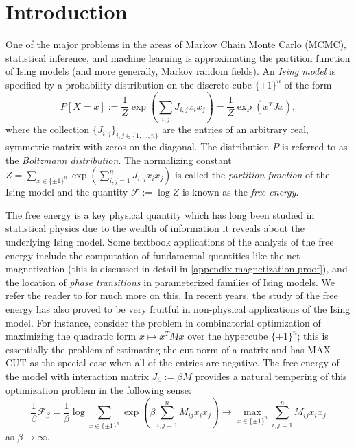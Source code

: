 \documentclass[final, 12pt]{colt2018}
\newcommand{\F}{\mathcal{F}}
\theoremstyle{definition}
\theoremstyle{plain}
\begin{document}
\section{Introduction}
One of the major problems in the areas of Markov Chain Monte Carlo (MCMC), statistical inference, and machine learning is approximating the partition function of Ising models (and more generally, Markov random fields). An \emph{Ising model} is specified by
a probability distribution on the discrete cube $\{\pm1\}^n$ of the form
\[ P[X = x] := \frac{1}{Z} \exp(\sum_{i,j} J_{i,j} x_i x_j) = \frac{1}{Z} \exp(x^T J x), \]
where the collection $\{J_{i,j}\}_{i,j\in\{1,\dots,n\}}$ are the entries of
an arbitrary real, symmetric matrix with zeros on the diagonal. The distribution $P$ is referred to as the \emph{Boltzmann distribution}. The normalizing constant $Z=\sum_{x\in\{\pm1\}^{n}}\exp(\sum_{i,j=1}^{n}J_{i,j}x_{i}x_{j})$
is called the \emph{partition function }of the Ising model and the quantity $\F := \log{Z}$ is known as the \emph{free energy}. 

The free energy is a key physical quantity which has long been studied in statistical physics due to the wealth of information it reveals about the underlying Ising model. Some textbook applications of the analysis of the free energy include the computation of fundamental quantities like the net magnetization (this is discussed in detail in \cref{appendix-magnetization-proof}), and the location of \emph{phase transitions} in parameterized families of Ising models. We refer the reader to \citep{ellis2007entropy} for much more on this. In recent years, the study of the free energy has also proved to be very fruitful in non-physical applications of the Ising model. For instance, consider the problem in combinatorial optimization of maximizing the quadratic form $x \mapsto x^T M x$ over the hypercube $\{\pm 1\}^{n}$; this is essentially the problem of estimating the cut norm of a matrix and has MAX-CUT as the special case when all of the entries are negative. The free energy of the model with interaction matrix $J_{\beta}:=\beta M$ provides a natural tempering of this optimization problem in the following sense:   
\[ \frac{1}{\beta} \mathcal{F}_{\beta} = \frac{1}{\beta} \log \sum_{x\in \{\pm 1\}^{n}}\exp\left(\beta \sum_{i,j=1}^{n}M_{ij}x_{i}x_{j}\right) \to \max_{x \in \{\pm 1\}^n} \sum_{i,j = 1}^n M_{ij} x_i x_j \]
as $\beta \to \infty$.
\end{document}
